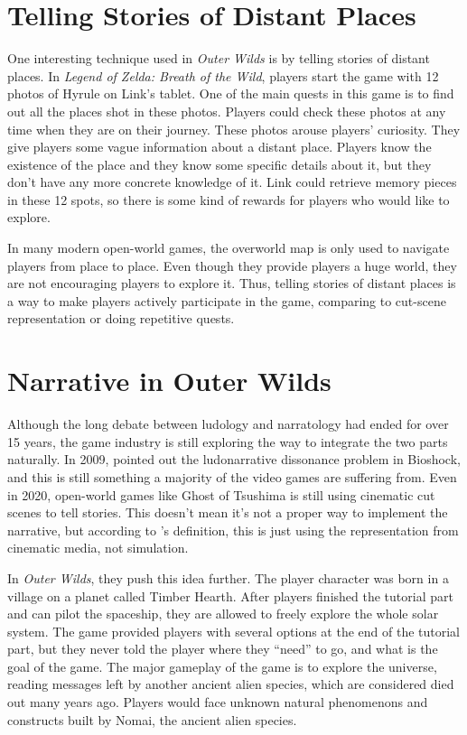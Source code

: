 \documentclass[mla7]{mla}
\begin{document}
\section{Telling Stories of Distant Places}
One interesting technique used in \textit{Outer Wilds} is by telling stories of
distant places. In \textit{Legend of Zelda: Breath of the Wild}, players start
the game with 12 photos of Hyrule on Link's tablet. One of the main quests in
this game is to find out all the places shot in these photos. Players could
check these photos at any time when they are on their journey. These photos
arouse players' curiosity. They give players some vague information about a
distant place. Players know the existence of the place and they know some
specific details about it, but they don't have any more concrete knowledge of
it. Link could retrieve memory pieces in these 12 spots, so there is some kind
of rewards for players who would like to explore.

In many modern open-world games, the overworld map is only used to navigate
players from place to place. Even though they provide players a huge world, they
are not encouraging players to explore it. Thus, telling stories of distant
places is a way to make players actively participate in the game, comparing to
cut-scene representation or doing repetitive quests.

\section{Narrative in Outer Wilds}
Although the long debate between ludology and narratology had ended for over 15
years, the game industry is still exploring the way to integrate the two parts
naturally. In 2009, \cite{hocking2009ludonarrative} pointed out the
ludonarrative dissonance problem in Bioshock, and this is still something a
majority of the video games are suffering from. Even in 2020, open-world games
like Ghost of Tsushima is still using cinematic cut scenes to tell stories. This
doesn't mean it's not a proper way to implement the narrative, but according
to \cite{frasca2003simulation}'s definition, this is just using the
representation from cinematic media, not simulation.

In \textit{Outer Wilds}, they push this idea further. The player character was
born in a village on a planet called Timber Hearth. After players finished the
tutorial part and can pilot the spaceship, they are allowed to freely explore
the whole solar system. The game provided players with several options at the
end of the tutorial part, but they never told the player where they ``need'' to
go, and what is the goal of the game. The major gameplay of the game is to
explore the universe, reading messages left by another ancient alien species,
which are considered died out many years ago. Players would face unknown natural
phenomenons and constructs built by Nomai, the ancient alien species.
\end{document}
